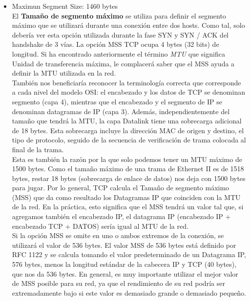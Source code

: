 \documentclass[osajnl,twocolumn,showpacs,superscriptaddress,10pt]{revtex4-1} %
\begin{document}
\begin{itemize}
    \item Maximun Segment Size: 1460 bytes \\

    El \textbf{Tamaño de segmento máximo} se utiliza para definir el segmento máximo que se utilizará durante una conexión entre dos hosts. 
    Como tal, solo debería ver esta opción utilizada durante la fase SYN y SYN / ACK del handshake de 3 vías. La opción MSS TCP 
    ocupa 4 bytes (32 bits) de longitud. Si ha encontrado anteriormente el término \textit{MTU} que significa Unidad de transferencia 
    máxima, le complacerá saber que el MSS ayuda a definir la MTU utilizada en la red. \\
    
    También nos beneficiaría reconocer la terminología correcta que corresponde a cada nivel del modelo OSI: el encabezado y los 
    datos de TCP se denominan segmento (capa 4), mientras que el encabezado y el segmento de IP se denominan datagramas de IP (capa 3). 
    Además, independientemente del tamaño que tendrá la MTU, la capa Datalink tiene una sobrecarga adicional de 18 bytes. 
    Esta sobrecarga incluye la dirección MAC de origen y destino, el tipo de protocolo, seguido de la secuencia de verificación de 
    trama colocada al final de la trama. \\

    Esta es también la razón por la que solo podemos tener un MTU máximo de 1500 bytes. Como el tamaño máximo de una trama de 
    Ethernet II es de 1518 bytes, restar 18 bytes (sobrecarga de enlace de datos) nos deja con 1500 bytes para jugar. Por lo general, 
    TCP calcula el Tamaño de segmento máximo (MSS) que da como resultado los Datagramas IP que coinciden con la MTU de la red. 
    En la práctica, esto significa que el MSS tendrá un valor tal que, si agregamos también el encabezado IP, el datagrama IP 
    (encabezado IP + encabezado TCP + DATOS) sería igual al MTU de la red. \\

    Si la opción MSS se omite en uno o ambos extremos de la conexión, se utilizará el valor de 536 bytes. El valor MSS de 536 
    bytes está definido por RFC 1122 y se calcula tomando el valor predeterminado de un Datagrama IP, 576 bytes, menos la 
    longitud estándar de la cabecera IP y TCP (40 bytes), que nos da 536 bytes. En general, es muy importante utilizar el mejor 
    valor de MSS posible para su red, ya que el rendimiento de su red podría ser extremadamente bajo si este valor es 
    demasiado grande o demasiado pequeño. \\


\end{itemize}
\end{document}
